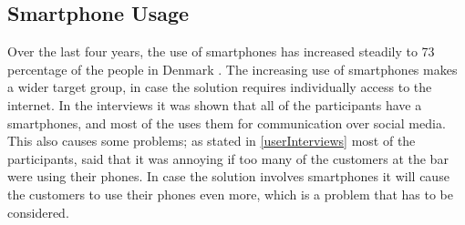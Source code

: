 \subsection{Smartphone Usage}
\label{sub:smartphone_usage}

Over the last four years, the use of smartphones has increased steadily to 73 percentage of the people in Denmark \cite{smartphone2014}. The increasing use of smartphones makes a wider target group, in case the solution requires individually access to the internet. In the interviews it was shown that all of the participants have a smartphones, and most of the uses them for communication over social media. This also causes some problems; as stated in \cref{userInterviews} most of the participants, said that it was annoying if too many of the customers at the bar were using their phones. In case the solution involves smartphones it will cause the customers to use their phones even more, which is a problem that has to be considered.

